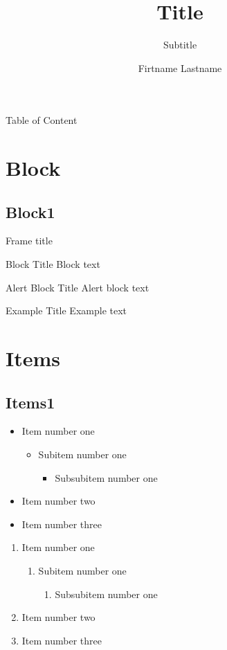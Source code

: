\documentclass[12pt,a4paper,compress]{beamer}
\title{Title}
\author{Firtname Lastname}
\subtitle{Subtitle}
\institute{Institue}
\begin{document}
\begin{frame}[plain]
	\maketitle
\end{frame}

\begin{frame}{Table of Content}
	\tableofcontents
\end{frame}

\section{Block}
\subsection{Block1}
\begin{frame}{Frame title}
	\begin{block}{Block Title}
		Block text
	\end{block}
	\begin{alertblock}{Alert Block Title}
		Alert block text
	\end{alertblock}
	\begin{example}{Example Title}
		Example text
	\end{example}
\end{frame}

\section{Items}
\subsection{Items1}
\begin{frame}
	\begin{itemize}
		\item Item number one
		\begin{itemize}
			\item Subitem number one
			\begin{itemize}
				\item Subsubitem number one
			\end{itemize}
		\end{itemize}
		\item Item number two
		\item Item number three
	\end{itemize}
	\begin{enumerate}
		\item Item number one
		\begin{enumerate}
			\item Subitem number one
			\begin{enumerate}
				\item Subsubitem number one
			\end{enumerate}
		\end{enumerate}
		\item Item number two
		\item Item number three
	\end{enumerate}
\end{frame}
\end{document}
